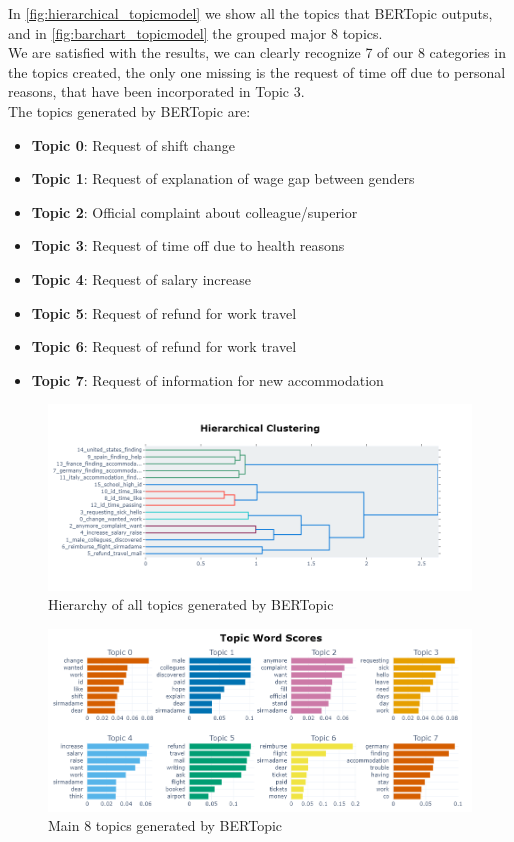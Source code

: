 In \autoref{fig:hierarchical_topicmodel} we show all the topics that BERTopic outputs, and in \autoref{fig:barchart_topicmodel} the grouped major 8 topics. \\
We are satisfied with the results, we can clearly recognize 7 of our 8 categories in the topics created, the only one missing is the request of time off due to personal reasons, that have been incorporated in Topic 3. \\
The topics generated by BERTopic are:
\begin{itemize}
    \item \textbf{Topic 0}: Request of shift change
    \item \textbf{Topic 1}: Request of explanation of wage gap between genders
    \item \textbf{Topic 2}: Official complaint about colleague/superior
    \item \textbf{Topic 3}: Request of time off due to health reasons
    \item \textbf{Topic 4}: Request of salary increase
    \item \textbf{Topic 5}: Request of refund for work travel
    \item \textbf{Topic 6}: Request of refund for work travel
    \item \textbf{Topic 7}: Request of information for new accommodation
\end{itemize}


\begin{figure}[h] 
    \includegraphics[width=\textwidth]{images/hierarchy_topic_model.png}
    \caption{Hierarchy of all topics generated by BERTopic}
    \label{fig:hierarchical_topicmodel}
\end{figure}


\begin{figure}[h] 
    \includegraphics[width=\textwidth]{images/barchart_topicmodel.png}
    \caption{Main 8 topics generated by BERTopic}
    \label{fig:barchart_topicmodel}
\end{figure}    
